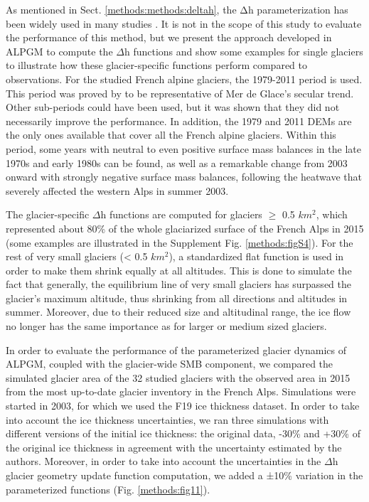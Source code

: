As mentioned in Sect. \ref{methods:methods:deltah}, the Δh parameterization has been widely used in many studies \citep[e.g.,][]{huss_modelling_2008, huss_future_2010, vincent_future_2014, huss_new_2015, huss_global-scale_2018, hanzer_projected_2018, vincent_declin_2019}. It is not in the scope of this study to evaluate the performance of this method, but we present the approach developed in ALPGM to compute the $\Delta$h functions and show some examples for single glaciers to illustrate how these glacier-specific functions perform compared to observations. For the studied French alpine glaciers, the 1979-2011 period is used. This period was proved by \citet{vincent_future_2014} to be representative of Mer de Glace’s secular trend. Other sub-periods could have been used, but it was shown that they did not necessarily improve the performance. In addition, the 1979 and 2011 DEMs are the only ones available that cover all the French alpine glaciers. Within this period, some years with neutral to even positive surface mass balances in the late 1970s and early 1980s can be found, as well as a remarkable change from 2003 onward with strongly negative surface mass balances, following the heatwave that severely affected the western Alps in summer 2003.

The glacier-specific $\Delta$h functions are computed for glaciers $\geq$ 0.5 \(km^2\), which represented about 80\% of the whole glaciarized surface of the French Alps in 2015 (some examples are illustrated in the Supplement Fig. \ref{methods:figS4}). For the rest of very small glaciers (< 0.5 \(km^2\)), a standardized flat function is used in order to make them shrink equally at all altitudes. This is done to simulate the fact that generally, the equilibrium line of very small glaciers has surpassed the glacier’s maximum altitude, thus shrinking from all directions and altitudes in summer. Moreover, due to their reduced size and altitudinal range, the ice flow no longer has the same importance as for larger or medium sized glaciers.

In order to evaluate the performance of the parameterized glacier dynamics of ALPGM, coupled with the glacier-wide SMB component, we compared the simulated glacier area of the 32 studied glaciers with the observed area in 2015 from the most up-to-date glacier inventory in the French Alps. Simulations were started in 2003, for which we used the F19 ice thickness dataset. In order to take into account the ice thickness uncertainties, we ran three simulations with different versions of the initial ice thickness: the original data, -30\% and +30\% of the original ice thickness in agreement with the uncertainty estimated by the authors. Moreover, in order to take into account the uncertainties in the $\Delta$h glacier geometry update function computation, we added a ±10\% variation in the parameterized functions (Fig. \ref{methods:fig11}).

